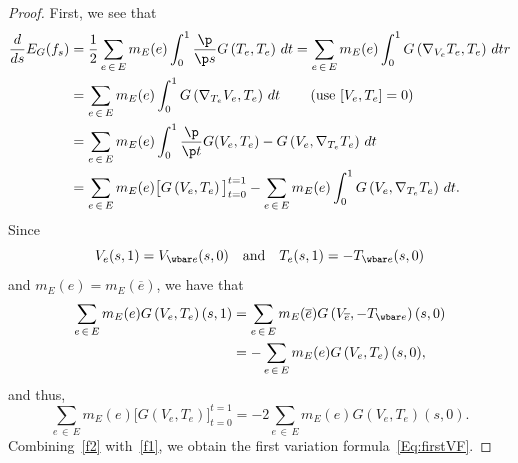 \begin{proof}
First, we see that
\begin{equation}\label{f1}
\begin{aligned}
\frac{d}{d s} E_G(f_{s}) &=\frac{1}{2}\sum_{e\,\in\,E}m_E(e)\int_0^1 \frac{\p}{\p s}G\left(T_e, T_e\right)\,dt =\sum_{e\,\in\,E}m_E(e)\int_0^1 G\left(\nabla_{V_e}T_e, T_e\right)\, dtr\\
&=\sum_{e\,\in\,E}m_E(e)\int_0^1G\left(\nabla_{T_e}V_e, T_e\right)\, dt \qquad  \left(\text{use }[V_e, T_e]=0\right)\\
&=\sum_{e\,\in\,E}m_E(e)\int_0^1\frac{\p}{\p t}G(V_e, T_e)- G\left(V_e, \nabla_{T_e}T_e\right)\, dt\\
&=\sum_{e\,\in\,E}m_E(e)\big[G\left(V_e, T_e\right)\big]_{t=0}^{t=1}-\sum_{e\,\in\,E}m_E(e)\int_0^1 G\left(V_e, \nabla_{T_e}T_e\right)\, dt.
\end{aligned}
\end{equation}
Since
\begin{equation}\label{Eq:ap1}
V_e(s, 1)=V_{\wbar e}(s, 0) \quad \text{and} \quad T_e(s,1)=- T_{\wbar e}(s,0)
\end{equation}
and $m_E(e)=m_E(\overline{e})$, we have that
\begin{align*}
\sum_{e\,\in\,E}m_E(e)G\left(V_e, T_e\right)(s,1) &=\sum_{e\,\in\,E}m_E(\overline{e})G\left( V_{\overline{e}}, -T_{\wbar e}\right)(s,0)\\
&=-\sum_{e\,\in\,E}m_E(e)G\left( V_e, T_e\right)(s,0),
\end{align*}
and thus,
\begin{equation}\label{f2}
\sum_{e\,\in\,E}m_E(e)\big[G\left(V_e, T_e\right)\big]_{t=0}^{t=1}=-2\sum_{e\,\in\,E}m_E(e)G\left(V_e, T_e\right)(s,0).
\end{equation}
Combining~\eqref{f2} with~\eqref{f1}, we obtain the first variation formula~\eqref{Eq:firstVF}.



\end{proof}

